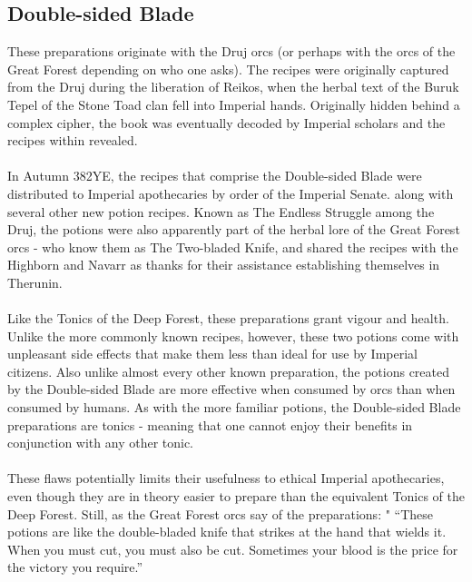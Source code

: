 \documentclass[a5paper,pagesize,10pt,bibtotoc,pointlessnumbers,
normalheadings,DIV=9,twoside=false]{scrbook}
\newcommand\mychapter[2]{
    \topskip0pt
    \vspace*{\fill}
    \begin{it}
    \chapter{#1}
        #2
    \end{it}
    \vspace*{\fill}
    \newpage
}
\begin{document}
\mychapter{Double-sided Blade}{
    These preparations originate with the Druj orcs (or perhaps with the orcs of the Great Forest depending on who one asks). The recipes were originally captured from the Druj during the liberation of Reikos, when the herbal text of the Buruk Tepel of the Stone Toad clan fell into Imperial hands. Originally hidden behind a complex cipher, the book was eventually decoded by Imperial scholars and the recipes within revealed.
    \\\\
    In Autumn 382YE, the recipes that comprise the Double-sided Blade were distributed to Imperial apothecaries by order of the Imperial Senate. along with several other new potion recipes. Known as The Endless Struggle among the Druj, the potions were also apparently part of the herbal lore of the Great Forest orcs - who know them as The Two-bladed Knife, and shared the recipes with the Highborn and Navarr as thanks for their assistance establishing themselves in Therunin.
    \\\\
    Like the Tonics of the Deep Forest, these preparations grant vigour and health. Unlike the more commonly known recipes, however, these two potions come with unpleasant side effects that make them less than ideal for use by Imperial citizens. Also unlike almost every other known preparation, the potions created by the Double-sided Blade are more effective when consumed by orcs than when consumed by humans. As with the more familiar potions, the Double-sided Blade preparations are tonics - meaning that one cannot enjoy their benefits in conjunction with any other tonic.
    \\\\
    These flaws potentially limits their usefulness to ethical Imperial apothecaries, even though they are in theory easier to prepare than the equivalent Tonics of the Deep Forest. Still, as the Great Forest orcs say of the preparations: " “These potions are like the double-bladed knife that strikes at the hand that wields it. When you must cut, you must also be cut. Sometimes your blood is the price for the victory you require.”
}
\end{document}
